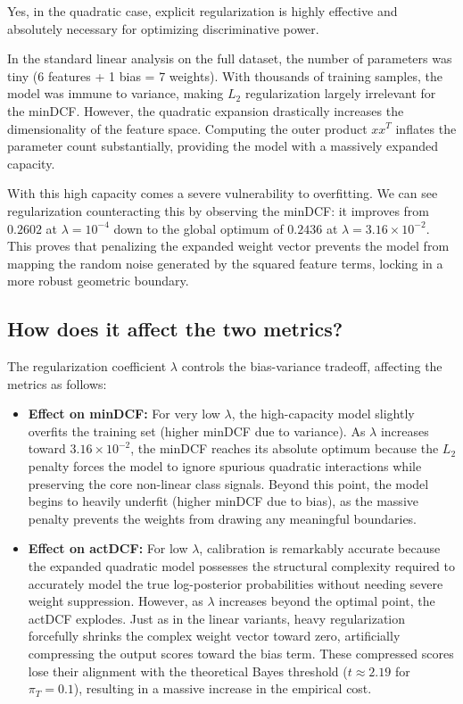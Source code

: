 Yes, in the quadratic case, explicit regularization is highly effective and absolutely necessary for optimizing discriminative power. 

In the standard linear analysis on the full dataset, the number of parameters was tiny (6 features + 1 bias = 7 weights). With thousands of training samples, the model was immune to variance, making $L_2$ regularization largely irrelevant for the minDCF. However, the quadratic expansion drastically increases the dimensionality of the feature space. Computing the outer product $xx^T$ inflates the parameter count substantially, providing the model with a massively expanded capacity.

With this high capacity comes a severe vulnerability to overfitting. We can see regularization counteracting this by observing the minDCF: it improves from $0.2602$ at $\lambda=10^{-4}$ down to the global optimum of $0.2436$ at $\lambda=3.16 \times 10^{-2}$. This proves that penalizing the expanded weight vector prevents the model from mapping the random noise generated by the squared feature terms, locking in a more robust geometric boundary.

\subsection*{How does it affect the two metrics?}

The regularization coefficient $\lambda$ controls the bias-variance tradeoff, affecting the metrics as follows:

\begin{itemize}
    \item \textbf{Effect on minDCF:} For very low $\lambda$, the high-capacity model slightly overfits the training set (higher minDCF due to variance). As $\lambda$ increases toward $3.16 \times 10^{-2}$, the minDCF reaches its absolute optimum because the $L_2$ penalty forces the model to ignore spurious quadratic interactions while preserving the core non-linear class signals. Beyond this point, the model begins to heavily underfit (higher minDCF due to bias), as the massive penalty prevents the weights from drawing any meaningful boundaries.
    
    \item \textbf{Effect on actDCF:} For low $\lambda$, calibration is remarkably accurate because the expanded quadratic model possesses the structural complexity required to accurately model the true log-posterior probabilities without needing severe weight suppression. However, as $\lambda$ increases beyond the optimal point, the actDCF explodes. Just as in the linear variants, heavy regularization forcefully shrinks the complex weight vector toward zero, artificially compressing the output scores toward the bias term. These compressed scores lose their alignment with the theoretical Bayes threshold ($t \approx 2.19$ for $\pi_T = 0.1$), resulting in a massive increase in the empirical cost.
\end{itemize}


